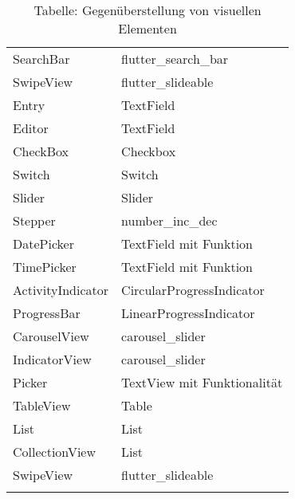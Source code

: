 \begin{xltabular}{\textwidth}{|X|X|}
	SearchBar		       				&  		flutter\_search\_bar 	\\ 
	SwipeView		       			&  		flutter\_slideable 		\\ 
	Entry		       						&  		TextField	 		\\ 
	Editor		       					&  		TextField	 		\\ 
	CheckBox		       				&  		Checkbox	 		\\ 
	Switch		       					&  		Switch	 		\\ 
	Slider		       					&  		Slider	 		\\ 
	Stepper		       				&  		number\_inc\_dec	 		\\ 
	DatePicker		       			&  		TextField mit Funktion		\\ 
	TimePicker		       			&  		TextField mit Funktion	 		\\ 
	ActivityIndicator		       	&  		CircularProgressIndicator 		\\ 
	ProgressBar		       			&  		LinearProgressIndicator 		\\ 
	CarouselView		       		&  		carousel\_slider  		\\ 
	IndicatorView		       		&  		carousel\_slider			\\ 	
	Picker		       					&  		TextView mit Funktionalität 		\\ 
	TableView		       				&  		Table		\\ 
	List		       						&  		List 		\\ 
	CollectionView		       		&  		List 		\\ 
	SwipeView		       			&  		flutter\_slideable 		\\ 	
	\hline

	  \caption*{Tabelle: Gegenüberstellung von visuellen Elementen}
 \label{tab:ComapreXFFlutter}
\end{xltabular}
